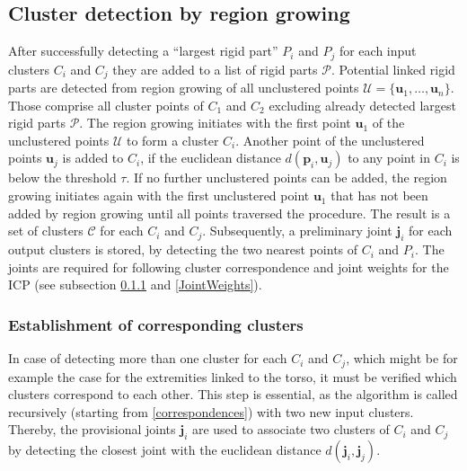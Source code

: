 \subsection{Cluster detection by region growing}
\label{cluster}
After successfully detecting a ``largest rigid part'' $P_i$ and $P_j$ for each input clusters $C_i$ and $C_j$ they are added to a list of rigid parts $\mathcal{P}$. Potential linked rigid parts are detected from region growing of all unclustered points $\mathcal{U} =  \{\boldsymbol{u}_1,\ldots,\boldsymbol{u}_n\}$. Those comprise all cluster points of $C_1$ and $C_2$ excluding already detected largest rigid parts $\mathcal{P}$. The region growing initiates with the first point $\boldsymbol{u}_1$ of the unclustered points $\mathcal{U}$ to form a cluster $C_i$. Another point of the unclustered points $\boldsymbol{u}_j$ is added to $C_i$, if the euclidean distance $d(\boldsymbol{p}_i,\boldsymbol{u}_j)$ to any point in $C_i$ is below the threshold $\tau$. If no further unclustered points can be added, the region growing initiates again with the first unclustered point $\boldsymbol{u}_1$ that has not been added by region growing until all points traversed the procedure. The result is a set of clusters $\mathcal{C}$ for each $C_i$ and $C_j$. Subsequently, a preliminary joint $\boldsymbol{j}_i$ for each output clusters is stored, by detecting the two nearest points of $C_i$ and $P_i$. The joints are required for following cluster correspondence and joint weights for the ICP (see subsection \ref{CorrespondingClusters} and \ref{JointWeights}).

\subsubsection{Establishment of corresponding clusters}
\label{CorrespondingClusters}
In case of detecting more than one cluster for each $C_i$ and $C_j$, which might be for example the case for the extremities linked to the torso, it must be verified which clusters correspond to each other. This step is essential, as the algorithm is called recursively (starting from \ref{correspondences}) with two new input clusters. Thereby, the provisional joints $\boldsymbol{j}_i$ are used to associate two clusters of $C_i$ and $C_j$ by detecting the closest joint with the euclidean distance $d(\boldsymbol{j}_i,\boldsymbol{j}_j)$.

